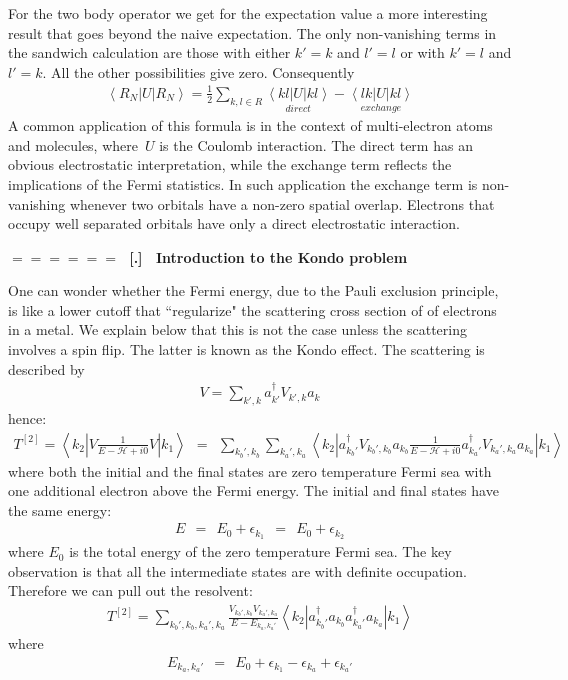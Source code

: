 \documentclass[onecolumn,fleqn]{revtex4}
\newcommand{\beq}{\begin{eqnarray}}
\newcommand{\eeq}{\end{eqnarray}}
\renewcommand{\thesubsection}{\arabic{subsection}}
\renewcommand{\thesubsubsection}{\arabic{subsubsection}}
\newcommand{\sheadC}[1]
{
\addtocounter{subsubsection}{1}
\vspace{5mm}
{\Large\bf $=\!=\!=\!=\!=\!=\;$ [\thesubsection.\thesubsubsection] \ #1}  
\nopagebreak
\phantomsection
}
\begin{document}
For the two body operator we get for the expectation value  
a more interesting result that goes beyond the naive expectation.
The only non-vanishing terms in the sandwich calculation 
are those with either $k'=k$ and $l'=l$ or with $k'=l$ and $l'=k$.  
All the other possibilities give zero. Consequently    
\beq
\left\langle R_N |U| R_N \right\rangle
=\frac{1}{2}
\sum_{k,l \in R} 
\underset{direct}{\left\langle kl|U| kl \right\rangle }
-\underset{exchange}{\left\langle lk|U|kl \right\rangle }
\eeq
A common application of this formula is in 
the context of multi-electron atoms and molecules, 
where~$U$ is the Coulomb interaction. 
The direct term has an obvious electrostatic 
interpretation, while the exchange term reflects 
the implications of the Fermi statistics.      
In such application the exchange term is non-vanishing 
whenever two orbitals have a non-zero spatial overlap. 
Electrons that occupy well separated orbitals 
have only a direct electrostatic interaction.   



\sheadC{Introduction to the Kondo problem}

One can wonder whether the Fermi energy, due to the Pauli  
exclusion principle, is like a lower cutoff that ``regularize" 
the scattering cross section of of electrons in a metal. 
We explain below that this is not the case unless the scattering 
involves a spin flip. The latter is known as the Kondo effect.    
The scattering is described by 
\beq
V = \sum_{k',k} a^{\dag}_{k'} V_{k',k} a_{k}
\eeq
hence:
\beq
T^{[2]} = 
\left\langle k_{2} \left| 
V \frac{1}{E-\mathcal{H}+i0} V 
\right|k_{1} \right\rangle
\ \ = \ \ 
\sum_{k_b',k_b}
\sum_{k_a',k_a}
\left\langle k_{2} \left| 
a^{\dag}_{k_b'} V_{k_b',k_b} a_{k_b}
\frac{1}{E-\mathcal{H}+i0}
a^{\dag}_{k_a'} V_{k_a',k_a} a_{k_a}
\right|k_{1}\right\rangle
\eeq
where both the initial and the final 
states are zero temperature Fermi sea 
with one additional electron above 
the Fermi energy. The initial and final 
states have the same energy:  
\beq
E \ \ = \ \  E_0 + \epsilon_{k_1} \ \ = \ \ E_0 + \epsilon_{k_2}
\eeq
where $E_0$ is the total energy of 
the zero temperature Fermi sea.
The key observation is that 
all the intermediate states are 
with definite occupation. 
Therefore we can pull out the resolvent:
\beq
T^{[2]}
=  \sum_{k_b',k_b,k_a',k_a}
\frac{V_{k_b',k_b} V_{k_a',k_a}}{E-E_{k_a,k_a'}}
\left\langle k_{2} \left| 
a^{\dag}_{k_b'}  a_{k_b}
a^{\dag}_{k_a'}  a_{k_a}
\right|k_{1}\right\rangle
\eeq
where 
\beq
E_{k_a,k_a'}\ \ = \ \ E_0 + \epsilon_{k_1} - \epsilon_{k_a} + \epsilon_{k_a'}
\eeq
\end{document}
